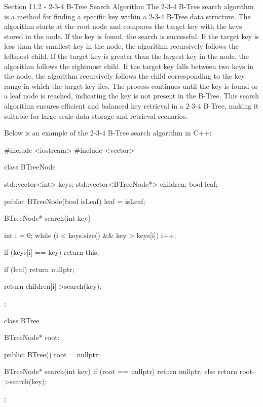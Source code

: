 \begin{notes}{Section 11.2 - 2-3-4 B-Tree Search Algorithm}
    The 2-3-4 B-Tree search algorithm is a method for finding a specific key within a 2-3-4 B-Tree data structure. The algorithm starts at the root node and compares the target key with the keys stored in the node. If the key is found, the search is successful. If the target key is less than the smallest key in the node, the algorithm recursively 
    follows the leftmost child. If the target key is greater than the largest key in the node, the algorithm follows the rightmost child. If the target key falls between two keys in the node, the algorithm recursively follows the child corresponding to the key range in which the target key lies. The process continues until the key is found or a leaf node 
    is reached, indicating the key is not present in the B-Tree. This search algorithm ensures efficient and balanced key retrieval in a 2-3-4 B-Tree, making it suitable for large-scale data storage and retrieval scenarios.
    
    \begin{highlight}
        Below is an example of the 2-3-4 B-Tree search algorithm in C++:
    
    \begin{code}[C++]
    #include <iostream>
    #include <vector>
    
    class BTreeNode {
        std::vector<int> keys;
        std::vector<BTreeNode*> children;
        bool leaf;
    
    public:
        BTreeNode(bool isLeaf) {
            leaf = isLeaf;
        }
    
        BTreeNode* search(int key) {
            int i = 0;
            while (i < keys.size() && key > keys[i]) {
                i++;
            }
    
            if (keys[i] == key) {
                return this;
            }
    
            if (leaf) {
                return nullptr;
            }
    
            return children[i]->search(key);
        }
    };
    
    class BTree {
        BTreeNode* root;
    
    public:
        BTree() {
            root = nullptr;
        }
    
        BTreeNode* search(int key) {
            if (root == nullptr) {
                return nullptr;
            } else {
                return root->search(key);
            }
        }
    };
    

\end{code}
\end{highlight}
\end{notes}
